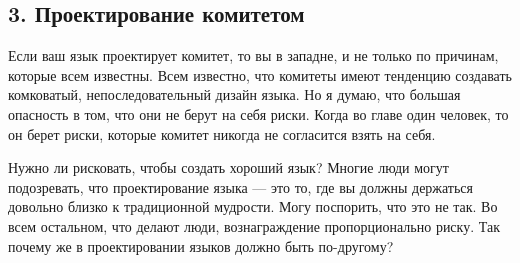 \documentclass[ebook,12pt,oneside,openany]{memoir}
\begin{document}
\subsection{3. Проектирование комитетом}

Если ваш язык проектирует комитет, то вы в западне, и не только по
причинам, которые всем известны. Всем известно, что комитеты имеют
тенденцию создавать комковатый, непоследовательный дизайн языка. Но я
думаю, что большая опасность в том, что они не берут на себя риски.
Когда во главе один человек, то он берет риски, которые комитет
никогда не согласится взять на себя. \newline

Нужно ли рисковать, чтобы создать хороший язык? Многие люди могут
подозревать, что проектирование языка — это то, где вы должны
держаться довольно близко к традиционной мудрости. Могу поспорить, что
это не так. Во всем остальном, что делают люди, вознаграждение
пропорционально риску. Так почему же в проектировании языков должно
быть по-другому?
\end{document}

